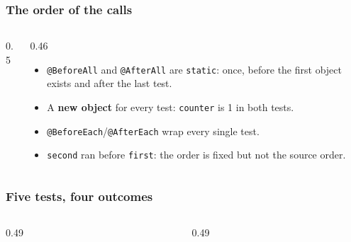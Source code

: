 \documentclass[aspectratio=169,10pt,compress]{beamer}
\begin{document}
\begin{frame}[t,fragile] \frametitle{The order of the calls}
  \begin{columns}[T]
    \begin{column}{0.5\textwidth}
    \end{column}
    \begin{column}{0.46\textwidth}
      \begin{itemize}\small
        \item \texttt{@BeforeAll} and \texttt{@AfterAll} are \texttt{static}: once, before the first object exists and after the last test.
        \item A \textbf{new object} for every test: \texttt{counter} is 1 in both tests.
        \item \texttt{@BeforeEach}/\texttt{@AfterEach} wrap every single test.
        \item \texttt{second} ran before \texttt{first}: the order is fixed but not the source order.
      \end{itemize}
    \end{column}
  \end{columns}
\end{frame}





\begin{frame}[t,fragile] \frametitle{Five tests, four outcomes}
  \begin{columns}[T]
    \begin{column}{0.49\textwidth}
    \end{column}
    \begin{column}{0.49\textwidth}
    \end{column}
  \end{columns}
\end{frame}
\end{document}
